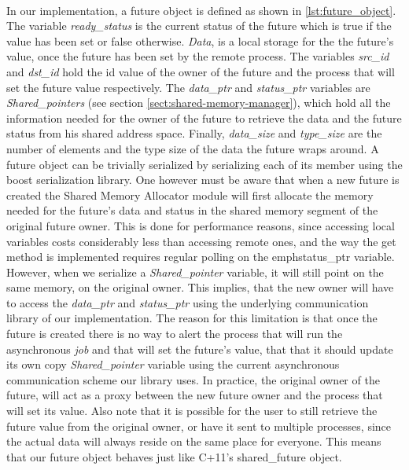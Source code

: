 \paragraph{}
In our implementation, a future object is defined as shown in \ref{lst:future_object}.
The variable \emph{ready\_status} is the current
status of the future which is true if the value has been set or false otherwise.  \emph{Data}, is a local storage for the
the future's value, once the future has been set by the remote process.  The variables \emph{src\_id} and \emph{dst\_id}
hold the id value of the owner of the future and the process that will set the future value respectively.  
The \emph{data\_ptr} and \emph{status\_ptr} variables are \emph{Shared\_pointers} (see section \ref{sect:shared-memory-manager}),
which hold all the
information needed for the owner of the future to retrieve the data and the future status from his shared address space. 
Finally, \emph{data\_size} and \emph{type\_size} are the number of elements and the
type size of the data the future wraps around.  A future object can be trivially serialized by serializing each
of its member using the boost serialization library.  One however must be aware that when a new future is created
the Shared Memory Allocator module will first allocate the memory needed for the future's data and status in the 
shared memory segment of the original future owner.  This is done for performance reasons, since accessing local
variables costs considerably less than accessing remote ones, and the way the get method is implemented requires 
regular polling on the emph{status\_ptr} variable.  However, when we serialize a \emph{Shared\_pointer} variable,
it will still point on the same memory, on the original owner.  This implies, that the new owner will have to 
access the \emph{data\_ptr} and \emph{status\_ptr} using the underlying communication library of our implementation.
The reason for this limitation is that once the future is created there is no way to alert the process that will
run the asynchronous \emph{job} and that will set the future's value, that that it should update its own copy \emph{Shared\_pointer}
variable using the current asynchronous communication scheme our library uses.  In practice, the original owner of the
future, will act as a proxy between the new future owner and the process that will set its value.  Also note that it is
possible for the user to still retrieve the future value from the original owner, or have it sent to multiple
processes, since the actual data will always reside on the same place for everyone.  This means that our future 
object behaves just like C+11's shared\_future object. 

